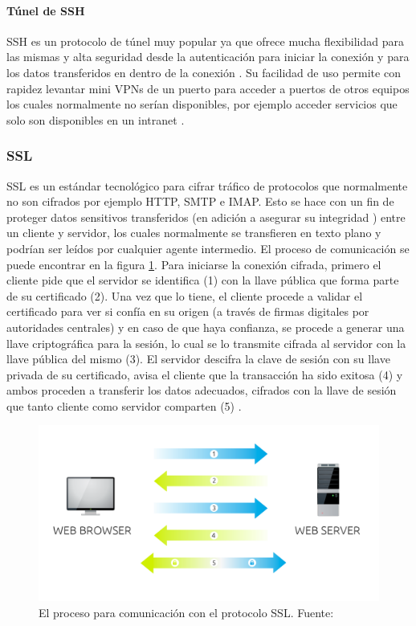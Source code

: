 \paragraph{Túnel de SSH}
SSH es un protocolo de túnel muy popular \citep{Kaspersky-Tunneling} ya que ofrece mucha flexibilidad para las mismas \citep{OpenSSH} y alta seguridad desde la autenticación para iniciar la conexión y para los datos transferidos en dentro de la conexión \citep{OpenBSD-OpenSSH-Features}. Su facilidad de uso permite con rapidez levantar mini VPNs de un puerto para acceder a puertos de otros equipos los cuales normalmente no serían disponibles, por ejemplo acceder servicios que solo son disponibles en un intranet \citep{ENP-Tunneling}.

\subsubsection{SSL}
SSL es un estándar tecnológico para cifrar tráfico \citep{info.SSL.com-SSL} \citep{GlobalSign-SSL} de protocolos que normalmente no son cifrados por ejemplo HTTP, SMTP e IMAP. Esto se hace con un fin de proteger datos sensitivos transferidos (en adición a asegurar su integridad \citep{info.SSL.com-SSL}) entre un cliente y servidor, los cuales normalmente se transfieren en texto plano y podrían ser leídos por cualquier agente intermedio. El proceso de comunicación se puede encontrar en la figura \ref{SSL-Proceso}. Para iniciarse la conexión cifrada, primero el cliente pide que el servidor se identifica (1) con la llave pública que forma parte de su certificado (2). Una vez que lo tiene, el cliente procede a validar el certificado para ver si confía en su origen (a través de firmas digitales por autoridades centrales) y en caso de que haya confianza, se procede a generar una llave criptográfica para la sesión, lo cual se lo transmite cifrada al servidor con la llave pública del mismo (3). El servidor descifra la clave de sesión con su llave privada de su certificado, avisa el cliente que la transacción ha sido exitosa (4) y ambos proceden a transferir los datos adecuados, cifrados con la llave de sesión que tanto cliente como servidor comparten (5) \citep{DigiCert-SSL}.

\begin{figure}
  \begin{center}
      \includegraphics[width=\textwidth]{Figures/ssl-proceso.png}
  \end{center}
  \caption{El proceso para comunicación con el protocolo SSL. Fuente: \citep{DigiCert-SSL}}
  \label{SSL-Proceso}
\end{figure}


